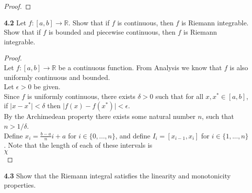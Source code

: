 \documentclass[12pt]{article}
\begin{document}
\begin{proof}
		
%		
%		
%		
%		
	\end{proof}



\hspace{-4 ex}\textbf{4.2} Let $f\colon[a,b]\to\mathbb{R}$. Show that if $f$ is continuous, then $f$ is Riemann integrable. Show that if $f$ is bounded and piecewise continuous, then $f$ is Riemann integrable. \bigbreak

	\begin{proof}  \text{ }\\
		Let $f : [a,b] \to \mathbb{R}$ be a continuous function. From Analysis we know that $f$ is also uniformly continuous and bounded.\\
		Let $\epsilon > 0$ be given. \\
		Since $f$ is uniformly continuous, there exists $ \delta >0$ such that for all $x,x^* \in [a,b]$, if $\vert x - x^* \vert < \delta$ then $\vert f(x) - f(x^*) \vert < \epsilon$.\\
		By the Archimedean property there exists some natural number $n$, such that $n > 1/\delta$. \\
		Define $x_i = \frac{b-a}{n} i+ a$ for $i \in \{0,...,n\}$, and define $I_i = [x_{i-1}, x_i]$ for $i \in \{1,...,n\}$. Note that the length of each of these intervals is \\
		$\chi$ \\
		
		
		
	\end{proof}



\hspace{-4 ex}\textbf{4.3} Show that the Riemann integral satisfies the linearity and monotonicity properties. \bigbreak
\end{document}
